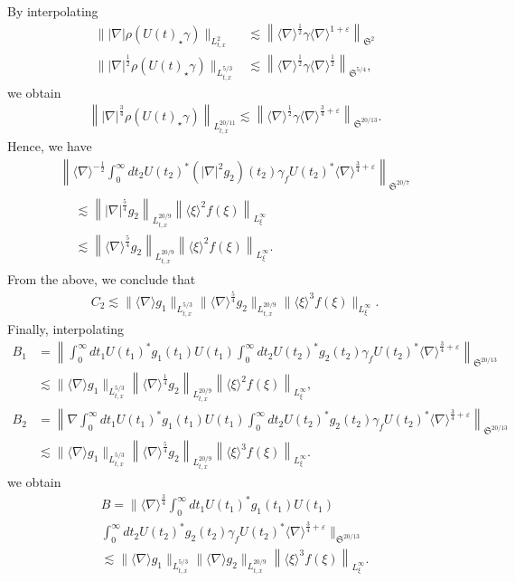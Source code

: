 \documentclass[10pt,a4paper]{amsart}
\providecommand{\No}[1]{\left\| #1 \right\|}
\newcommand{\FS}{\mathfrak{S}}
\newcommand{\ga}{\gamma}
\newcommand{\ep}{\varepsilon}
\newcommand{\rh}{\rho}
\renewcommand{\No}[1]{\left\| #1 \right\|}
\newcommand{\I}{\infty}
\newcommand{\sd}{\langle \nabla \rangle}
\newcommand{\lxr}{\langle \xi \rangle}
\newcommand{\tx}{{t,x}}
\newcommand{\st}{\star}
\newcommand{\ft}{{\frac{1}{4}}}
\newcommand{\fh}{\frac{3}{4}}
\newcommand{\tw}{\frac{1}{2}}
\newcommand{\na}{\nabla}
\newcommand{\ls}{\lesssim}
\begin{document}
By interpolating
\begin{align}
\||\na| \rh(U(t)_\st \ga)\|_{L^2_\tx} &\ls \left\|\sd^\tw \ga \sd^{1+\ep}\right\|_{\FS^2} \\
\||\na|^{\tw}\rh(U(t)_\st \ga)\|_{L^{5/3}_\tx} &\ls \left\|\sd^\tw \ga \sd^\tw \right\|_{\FS^{5/4}},
\end{align}
we obtain
\begin{align}
\left\||\na|^\frac{3}{4} \rh(U(t)_\st \ga)\right\|_{L^{20/11}_\tx} \ls \left\|\sd^\tw \ga \sd^{\frac{3}{4} + \ep}\right\|_{\FS^{20/13}}.
\end{align}
Hence, we have
\begin{multline}
\No{\sd^{-\tw} \int_0^\I dt_2 U(t_2)^* \left(|\na|^2 g_2\right)(t_2)\ga_f U(t_2)^* \sd^{\fh+\ep} }_{\FS^{20/7}} \\
\begin{aligned}
&\ls \left\||\na|^{\frac{5}{4}}g_2\right\|_{L^{20/9}_\tx} \left\|\lxr^2 f(\xi)\right\|_{L^\I_\xi}
\\
&\ls \left\|\sd^{\frac{5}{4}} g_2\right\|_{L^{20/9}_\tx} \left\|\lxr^2 f(\xi)\right\|_{L^\I_\xi}.
\end{aligned}
\end{multline}
From the above, we conclude that
\begin{align}
C_2 \ls \|\sd g_1\|_{L^{5/3}_\tx} \|\sd^{\frac{5}{4}} g_2\|_{L^{20/9}_\tx} \|\lxr^3 f(\xi)\|_{L^\I_\xi}.
\end{align}
Finally, interpolating
\begin{align}
B_1&=\No{\int_0^\I dt_1 U(t_1)^* g_1(t_1) U(t_1) \int_0^\I dt_2 U(t_2)^* g_2(t_2)\ga_f U(t_2)^* \sd^{\fh+\ep} }_{\FS^{20/13}} \\
&\ls \|\sd g_1\|_{L^{5/3}_\tx} \left\|\sd^\ft g_2\right\|_{L^{20/9}_\tx} \left\|\lxr^2 f(\xi)\right\|_{L^\I_\xi}, \nonumber\\
B_2&=\No{\na \int_0^\I dt_1 U(t_1)^* g_1(t_1) U(t_1) \int_0^\I dt_2 U(t_2)^* g_2(t_2)\ga_f U(t_2)^* \sd^{\fh+\ep} }_{\FS^{20/13}} \\
&\ls \|\sd g_1\|_{L^{5/3}_\tx} \left\|\sd^{\frac{5}{4}} g_2\right\|_{L^{20/9}_\tx} \left\|\lxr^3 f(\xi)\right\|_{L^\I_\xi}.\nonumber
\end{align}
we obtain
\begin{multline}
B=\bigg\|\sd^{\fh}\int_0^\I dt_1 U(t_1)^* g_1(t_1) U(t_1) \\
\int_0^\I dt_2 U(t_2)^* g_2(t_2)\ga_f U(t_2)^* \sd^{\fh+\ep} \bigg\|_{\FS^{20/13}} \\
\ls \|\sd g_1\|_{L^{5/3}_\tx} \|\sd g_2\|_{L^{20/9}_\tx} \left\|\lxr^{3} f(\xi)\right\|_{L^\I_\xi}.
\end{multline}
\end{document}
